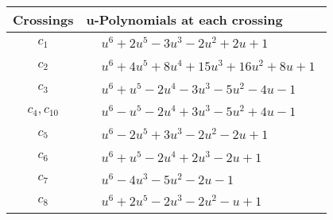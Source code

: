 \documentclass[1p]{elsarticle_modified}
\theoremstyle{definition}
\begin{document}
\begin{tabular}{m{50pt}|m{274pt}}
Crossings & \hspace{64pt}u-Polynomials at each crossing \\
\hline $$\begin{aligned}c_{1}\end{aligned}$$&$\begin{aligned}
&u^6+2 u^5-3 u^3-2 u^2+2 u+1
\end{aligned}$\\
\hline $$\begin{aligned}c_{2}\end{aligned}$$&$\begin{aligned}
&u^6+4 u^5+8 u^4+15 u^3+16 u^2+8 u+1
\end{aligned}$\\
\hline $$\begin{aligned}c_{3}\end{aligned}$$&$\begin{aligned}
&u^6+u^5-2 u^4-3 u^3-5 u^2-4 u-1
\end{aligned}$\\
\hline $$\begin{aligned}c_{4},c_{10}\end{aligned}$$&$\begin{aligned}
&u^6- u^5-2 u^4+3 u^3-5 u^2+4 u-1
\end{aligned}$\\
\hline $$\begin{aligned}c_{5}\end{aligned}$$&$\begin{aligned}
&u^6-2 u^5+3 u^3-2 u^2-2 u+1
\end{aligned}$\\
\hline $$\begin{aligned}c_{6}\end{aligned}$$&$\begin{aligned}
&u^6+u^5-2 u^4+2 u^3-2 u+1
\end{aligned}$\\
\hline $$\begin{aligned}c_{7}\end{aligned}$$&$\begin{aligned}
&u^6-4 u^3-5 u^2-2 u-1
\end{aligned}$\\
\hline $$\begin{aligned}c_{8}\end{aligned}$$&$\begin{aligned}
&u^6+2 u^5-2 u^3-2 u^2- u+1
\end{aligned}$\\

\end{tabular}
\end{document}

